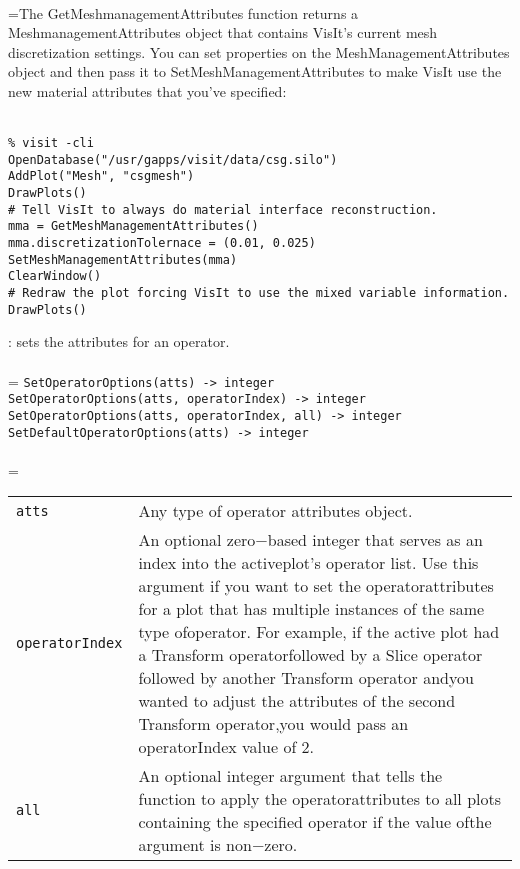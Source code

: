 \documentclass[10pt,a4paper]{report}
\begin{document}
 \\ 
\hangindent=\parindent The GetMeshmanagementAttributes function returns a MeshmanagementAttributes object that contains VisIt's current mesh discretization settings. You can set properties on the MeshManagementAttributes object and then pass it to SetMeshManagementAttributes to make VisIt use the new material attributes that you've specified: \\[-3mm] 

\\[-6mm]
\begin{verbatim}% visit -cli
OpenDatabase("/usr/gapps/visit/data/csg.silo")
AddPlot("Mesh", "csgmesh")
DrawPlots()
# Tell VisIt to always do material interface reconstruction.
mma = GetMeshManagementAttributes()
mma.discretizationTolernace = (0.01, 0.025)
SetMeshManagementAttributes(mma)
ClearWindow()
# Redraw the plot forcing VisIt to use the mixed variable information.
DrawPlots()
\end{verbatim}
\newpage


{}
: sets the attributes for an operator.\\[-3mm]

 \\ 
\hangindent=\parindent 
\verb!SetOperatorOptions(atts) -> integer!\\ 
\verb!SetOperatorOptions(atts, operatorIndex) -> integer!\\ 
\verb!SetOperatorOptions(atts, operatorIndex, all) -> integer!\\ 
\verb!SetDefaultOperatorOptions(atts) -> integer!\\ [-3mm]

 \\ 
\hangindent=\parindent 
\begin{tabular}{lp{9cm}}
\verb!atts! & Any type of operator attributes object. \\
\verb!operatorIndex! & An optional zero$-$based integer that serves as an index into the activeplot's operator list. Use this argument if you want to set the operatorattributes for a plot that has multiple instances of the same type ofoperator. For example, if the active plot had a Transform operatorfollowed by a Slice operator followed by another Transform operator andyou wanted to adjust the attributes of the second Transform operator,you would pass an operatorIndex value of 2. \\
\verb!all! & An optional integer argument that tells the function to apply the operatorattributes to all plots containing the specified operator if the value ofthe argument is non$-$zero. \\
\end{tabular} \\[-2mm]
\end{document}
